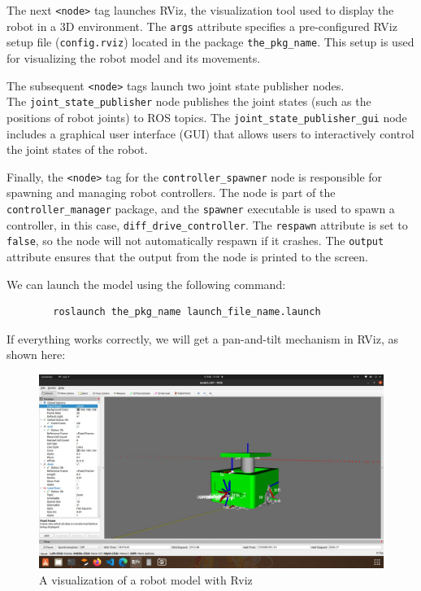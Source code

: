 \documentclass[../../main]{subfiles}
\begin{document}
    The next \texttt{<node>} tag launches RViz, the visualization tool used to display the robot in a 3D environment. The \texttt{args} attribute specifies a pre-configured RViz setup file (\texttt{config.rviz}) located in the package \texttt{the\_pkg\_name}. This setup is used for visualizing the robot model and its movements.
    
    The subsequent \texttt{<node>} tags launch two joint state publisher nodes.\\ The \texttt{joint\_state\_publisher} node publishes the joint states (such as the positions of robot joints) to ROS topics. The \texttt{joint\_state\_publisher\_gui} node includes a graphical user interface (GUI) that allows users to interactively control the joint states of the robot.
    
    Finally, the \texttt{<node>} tag for the \texttt{controller\_spawner} node is responsible for spawning and managing robot controllers. The node is part of the \texttt{controller\_manager} package, and the \texttt{spawner} executable is used to spawn a controller, in this case, \texttt{diff\_drive\_controller}. The \texttt{respawn} attribute is set to \texttt{false}, so the node will not automatically respawn if it crashes. The \texttt{output} attribute ensures that the output from the node is printed to the screen.
    
    We can launch the model using the following command:
    \begin{verbatim}
        roslaunch the_pkg_name launch_file_name.launch
    \end{verbatim}
    If everything works correctly, we will get a pan-and-tilt mechanism in RViz, as shown
    here:
    \begin{figure}[ht]
        \centering
        \includegraphics[width=\textwidth]{img/roborRvz.jpg}
        \caption{A visualization of a robot model with Rviz}

    \end{figure}
    \newpage
\end{document}
